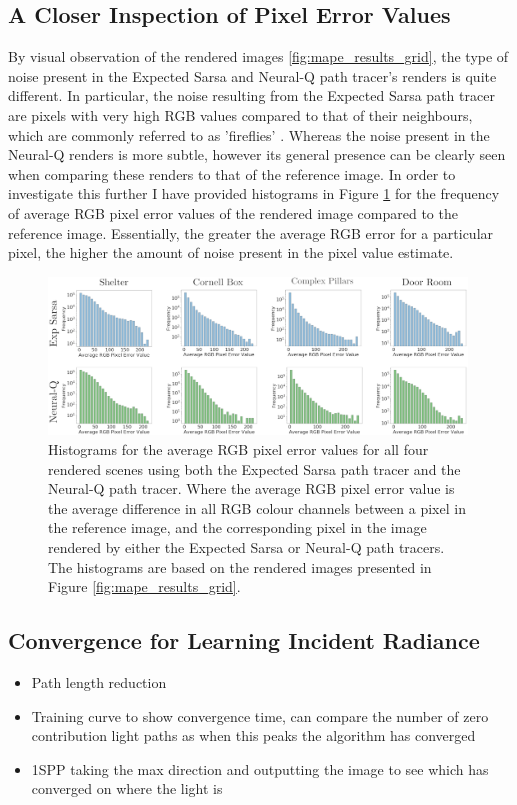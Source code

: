 \documentclass[../dissertation.tex]{subfiles}
\begin{document}
\subsection{A Closer Inspection of Pixel Error Values}

By visual observation of the rendered images \ref{fig:mape_results_grid}, the type of noise present in the Expected Sarsa and Neural-Q path tracer's renders is quite different. In particular, the noise resulting from the Expected Sarsa path tracer are pixels with very high RGB values compared to that of their neighbours, which are commonly referred to as 'fireflies'  \cite{christensen2016path}. Whereas the noise present in the Neural-Q renders is more subtle, however its general presence can be clearly seen when comparing these renders to that of the reference image. In order to investigate this further I have provided histograms in Figure \ref{fig:histogram_errors} for the frequency of average RGB pixel error values of the rendered image compared to the reference image. Essentially, the greater the average RGB error for a particular pixel, the higher the amount of noise present in the pixel value estimate.

\begin{figure}[h]
\begin{center}
\includegraphics[width=0.99\textwidth]{images/noise_diff.png}    
\end{center}
\caption{Histograms for the average RGB pixel error values for all four rendered scenes using both the Expected Sarsa path tracer and the Neural-Q path tracer. Where the average RGB pixel error value is the average difference in all RGB colour channels between a pixel in the reference image, and the corresponding pixel in the image rendered by either the Expected Sarsa or Neural-Q path tracers. The histograms are based on the rendered images presented in Figure \ref{fig:mape_results_grid}.}
\label{fig:histogram_errors}
\end{figure}

\subsection{Convergence for Learning Incident Radiance}
\begin{itemize}
\item Path length reduction
\item Training curve to show convergence time, can compare the number of zero contribution light paths as when this peaks the algorithm has converged
\item 1SPP taking the max direction and outputting the image to see which has converged on where the light is
\end{itemize}
\end{document}

